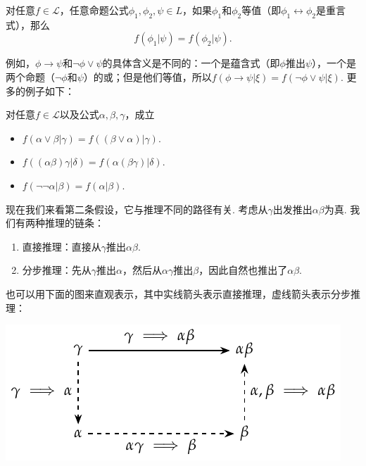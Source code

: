 \begin{principle}[等值原则]
    对任意$f\in\mathcal L$，任意命题公式$\phi_1,\phi_2,\psi\in L$，如果$\phi_1$和$\phi_2$等值（即$\phi_1\leftrightarrow\phi_2$是重言式），那么
    \[
        f(\phi_1|\psi)=f(\phi_2|\psi).
    \]
\end{principle}

例如，$\phi\to \psi$和$\neg \phi\vee \psi$的具体含义是不同的：一个是蕴含式（即$\phi$推出$\psi$），一个是两个命题（$\neg \phi$和$\psi$）的或；但是他们等值，所以$f(\phi\to \psi | \xi)=f(\neg \phi\vee \psi|\xi)$. 更多的例子如下：

\begin{example}
    对任意$f\in\mathcal L$以及公式$\alpha,\beta,\gamma$，成立
    \begin{itemize}
        \item $f(\alpha\vee \beta | \gamma)=f((\beta\vee \alpha) | \gamma)$.
        \item $f((\alpha\beta)\gamma|\delta)=f(\alpha(\beta\gamma)|\delta)$.
        \item $f(\neg\neg \alpha|\beta)=f(\alpha|\beta)$.
    \end{itemize}
\end{example}

现在我们来看第二条假设，它与推理不同的路径有关. 考虑从$\gamma$出发推出$\alpha\beta$为真. 我们有两种推理的链条：
\begin{enumerate}
    \item 直接推理：直接从$\gamma$推出$\alpha\beta$.
    \item 分步推理：先从$\gamma$推出$\alpha$，然后从$\alpha\gamma$推出$\beta$，因此自然也推出了$\alpha\beta$.
\end{enumerate}
也可以用下面的图来直观表示，其中实线箭头表示直接推理，虚线箭头表示分步推理：

\begin{center}
\includegraphics{figures/plausible-reasoning/two-chain-reasoning.pdf}
\end{center}


